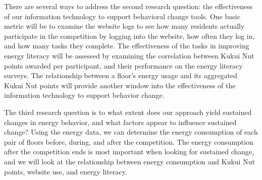 There are several ways to address the second research question: the effectiveness of our information technology to support behavioral change tools. One basic metric will be to examine the website logs to see how many residents actually participate in the competition by logging into the website, how often they log in, and how many tasks they complete. The effectiveness of the tasks in improving energy literacy will be assessed by examining the correlation between Kukui Nut points awarded per participant, and their performance on the energy literacy surveys. The relationship between a floor's energy usage and its aggregated Kukui Nut points will provide another window into the effectiveness of the information technology to support behavior change.

The third research question is to what extent does our approach yield sustained changes in energy behavior, and what factors appear to influence sustained change? Using the energy data, we can determine the energy consumption of each pair of floors before, during, and after the competition. The energy consumption after the competition ends is most important when looking for sustained change, and we will look at the relationship between energy consumption and Kukui Nut points, website use, and energy literacy.